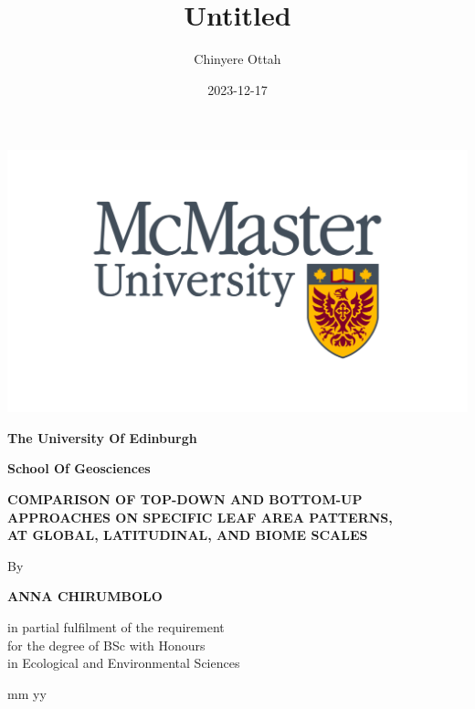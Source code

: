 \documentclass[
  11pt,
]{article}
\title{Untitled}
\author{Chinyere Ottah}
\date{2023-12-17}
\begin{document}
\maketitle

\allsectionsfont{\centering}
\subsectionfont{\raggedright}
\subsubsectionfont{\raggedright}


\begin{centering}

\vspace{3cm}


\includegraphics[width=0.2\linewidth]{img/uniedlogo} 

\vspace{1cm}

\Large
{\bf The University Of Edinburgh}

\Large
{\bf School Of Geosciences}

\vspace{1cm}

\Large

\doublespacing
{\bf COMPARISON OF TOP-DOWN AND BOTTOM-UP APPROACHES ON SPECIFIC LEAF AREA PATTERNS, \\AT GLOBAL, LATITUDINAL, AND BIOME SCALES}

\vspace{1 cm}

\normalsize
\singlespacing
By

\vspace{0.5 cm}

\Large

{\bf ANNA CHIRUMBOLO}

\vspace{1.5 cm}

in partial fulfilment of the requirement \\
for the degree of BSc with Honours \\
in Ecological and Environmental Sciences

\vspace{1.5 cm}

\normalsize
mm yy

\end{centering}
\end{document}
